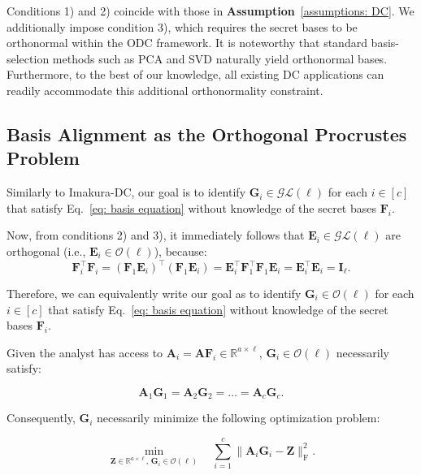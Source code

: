 \documentclass[final,3p,times]{elsarticle}
\theoremstyle{plain}
\newcommand{\matr}[1]{\bm{#1}}        %
\begin{document}
Conditions 1) and 2) coincide with those in \textbf{Assumption}~\ref{assumptions: DC}. We additionally impose condition 3), which requires the secret bases to be orthonormal within the ODC framework. It is noteworthy that standard basis-selection methods such as PCA and SVD naturally yield orthonormal bases. Furthermore, to the best of our knowledge, all existing DC applications can readily accommodate this additional orthonormality constraint.

\subsection{Basis Alignment as the Orthogonal Procrustes Problem}

Similarly to Imakura-DC, our goal is to identify \( \matr{G}_i \in \mathcal{GL}(\ell) \) for each \( i \in [c] \) that satisfy Eq.~\eqref{eq: basis equation} without knowledge of the secret bases \(\matr{F}_i\).

Now, from conditions 2) and 3), it immediately follows that \( \matr{E}_i \in \mathcal{GL}(\ell) \) are orthogonal (i.e., \(\matr{E}_i \in \mathcal{O}(\ell)\)), because:
\begin{equation}
\matr{F}_i^\top \matr{F}_i = (\matr{F}_1\matr{E}_i)^\top (\matr{F}_1\matr{E}_i) 
= \matr{E}_i^\top \matr{F}_1^\top \matr{F}_1 \matr{E}_i 
= \matr{E}_i^\top \matr{E}_i 
= \matr{I}_\ell.
\end{equation}

Therefore, we can equivalently write our goal as to identify \( \matr{G}_i \in \mathcal{O}(\ell) \) for each \( i \in [c] \) that satisfy Eq.~\eqref{eq: basis equation} without knowledge of the secret bases \(\matr{F}_i\).

Given the analyst has access to \(\matr{A}_i = \matr{A}\matr{F}_i \in \mathbb{R}^{a\times \ell}\), \(\matr{G}_i \in \mathcal{O(\ell)}\) necessarily satisfy:

\begin{equation}
    \matr{A}_1\matr{G}_1 = \matr{A}_2\matr{G}_2 = \dots = \matr{A}_c\matr{G}_c.
\end{equation}

Consequently, \(\matr{G}_i\) necessarily minimize the following optimization problem:

\begin{equation}
\label{prob: GOPP}
\min_{\matr{Z} \in \mathbb{R}^{a \times \ell},\,\matr{G}_i \in \mathcal{O}(\ell)} \quad \sum_{i=1}^{c} \|\matr{A}_i \matr{G}_i - \matr{Z}\|_\mathrm{F}^2.
\end{equation}
\end{document}
